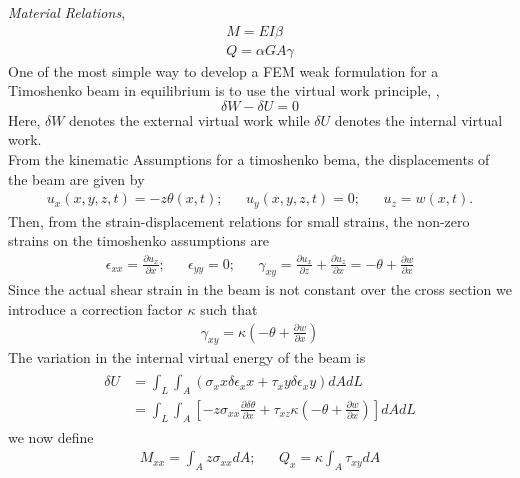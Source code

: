 \documentclass[10pt,twoside,a4paper]{article}
\begin{document}
\emph{Material Relations},
\begin{subequations}
	\begin{align}
	M = E I \beta \\
	Q = \alpha G A \gamma
	\end{align}
\end{subequations}
One of the most simple way to develop a FEM weak formulation for a Timoshenko beam in equilibrium is to use the virtual work principle, \cite{Wiki},
\begin{equation}
	\delta W - \delta U = 0
	\label{eq:virtual_work_principle}
\end{equation}
Here, $\delta W$ denotes the external virtual work while $\delta U$ denotes the internal virtual work. \\
From the kinematic Assumptions for a timoshenko bema, the displacements of the beam are given by
\begin{align}
	&u_x(x,y,z,t)=-z\theta(x,t);& &u_y(x,y,z,t)=0;& &u_z=w(x,t).&
\end{align}
Then, from the strain-displacement relations for small strains, the non-zero strains on the timoshenko assumptions are
\begin{align}
	&\epsilon_{xx} = \frac{\partial u_x}{\partial x};& 
	&\epsilon_{yy} = 0;& 
	&\gamma_{xy}   = \frac{\partial u_x}{\partial z}+\frac{\partial u_z}{\partial x} 
		= -\theta+\frac{\partial w}{\partial x}&
\end{align}
Since the actual shear strain in the beam is not constant over the cross section we introduce a correction factor $\kappa$ such that 
\begin{align}
	\gamma_{xy} = \kappa \left( -\theta + \frac{\partial w}{\partial x} \right)
\end{align}
The variation in the internal virtual energy of the beam is
\begin{align}
	\begin{split}
	\delta U &= \int_L \int_A (\sigma_xx\delta\epsilon_xx+\tau_xy\delta\epsilon_xy)dAdL \\
		&= \int_L \int_A \left[ -z \sigma_{xx}\frac{\partial \delta\theta}{\partial x}
		+ \tau_{xz} \kappa \left( -\theta + \frac{\partial w}{\partial x} \right) \right] dAdL 	
	\end{split}
	\label{eq:dev_internal_virtual_energy}
\end{align}
we now define
\begin{align}
	&M_{xx} = \int_A z \sigma_{xx} dA;& &Q_x = \kappa \int_A \tau_{xy} dA&
\end{align}
\end{document}
